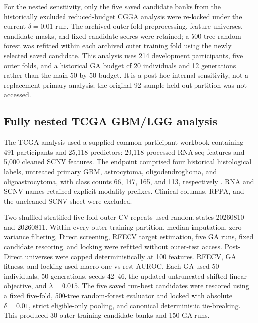 For the nested sensitivity, only the five saved candidate banks from the historically excluded reduced-budget CGGA analysis were re-locked under the current \(\delta=0.01\) rule. The archived outer-fold preprocessing, feature universes, candidate masks, and fixed candidate scores were retained; a 500-tree random forest was refitted within each archived outer training fold using the newly selected saved candidate. This analysis uses 214 development participants, five outer folds, and a historical GA budget of 20 individuals and 12 generations rather than the main 50-by-50 budget. It is a post hoc internal sensitivity, not a replacement primary analysis; the original 92-sample held-out partition was not accessed.

\subsection{Fully nested TCGA GBM/LGG analysis}

The TCGA analysis used a supplied common-participant workbook containing 491 participants and 25,118 predictors: 20,118 processed RNA-seq features and 5,000 cleaned SCNV features. The endpoint comprised four historical histological labels, untreated primary GBM, astrocytoma, oligodendroglioma, and oligoastrocytoma, with class counts 66, 147, 165, and 113, respectively \citep{ref44,ref45,ref46}. RNA and SCNV names retained explicit modality prefixes. Clinical columns, RPPA, and the uncleaned SCNV sheet were excluded.

Two shuffled stratified five-fold outer-CV repeats used random states 20260810 and 20260811. Within every outer-training partition, median imputation, zero-variance filtering, Direct screening, RFECV target estimation, five GA runs, fixed candidate rescoring, and locking were refitted without outer-test access. Post-Direct universes were capped deterministically at 100 features. RFECV, GA fitness, and locking used macro one-vs-rest AUROC. Each GA used 50 individuals, 50 generations, seeds 42--46, the updated untruncated shifted-linear objective, and \(\lambda=0.015\). The five saved run-best candidates were rescored using a fixed five-fold, 500-tree random-forest evaluator and locked with absolute \(\delta=0.01\), strict eligible-only pooling, and canonical deterministic tie-breaking. This produced 30 outer-training candidate banks and 150 GA runs.

